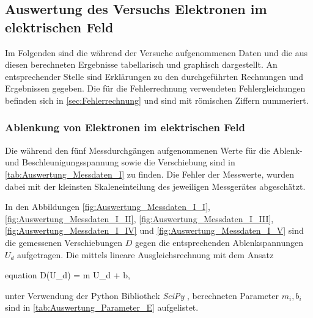 \subsection{Auswertung des Versuchs Elektronen im elektrischen Feld}
	
	Im Folgenden sind die während der Versuche aufgenommenen Daten
	und die aus diesen berechneten Ergebnisse tabellarisch und graphisch
	dargestellt. An entsprechender Stelle sind Erklärungen zu den 
	durchgeführten Rechnungen und Ergebnissen gegeben.
	Die für die Fehlerrechnung verwendeten Fehlergleichungen befinden 
	sich in \cref{sec:Fehlerrechnung} und sind mit römischen Ziffern nummeriert.
	

	\subsubsection{Ablenkung von Elektronen im elektrischen Feld}
	
		Die während den fünf Messdurchgängen aufgenommenen Werte für die
		Ablenk- und Beschleunigungsspannung sowie die Verschiebung sind in \cref{tab:Auswertung_Messdaten_I} zu finden.
		Die Fehler der Messwerte, wurden dabei mit der kleinsten Skaleneinteilung des 
		jeweiligen Messgerätes abgeschätzt.
				
			   
		
		In den Abbildungen \ref{fig:Auswertung_Messdaten_I_I}, \ref{fig:Auswertung_Messdaten_I_II},
		\ref{fig:Auswertung_Messdaten_I_III}, \ref{fig:Auswertung_Messdaten_I_IV} und
		\ref{fig:Auswertung_Messdaten_I_V} sind die 
		gemessenen Verschiebungen $D$ gegen die entsprechenden Ablenkspannungen $U_{d}$ aufgetragen.
		Die mittels lineare Ausgleichsrechnung mit dem Ansatz 
		\begin{empheq}{equation}
			D(U_{d}) = m \cdot U_{d} + b,
		\end{empheq} 
		unter Verwendung der Python Bibliothek \emph{SciPy} \cite{SciPy},
		berechneten Parameter $m_{i}, b_{i}$ sind in \cref{tab:Auswertung_Parameter_E} aufgelistet.
		
		
		
